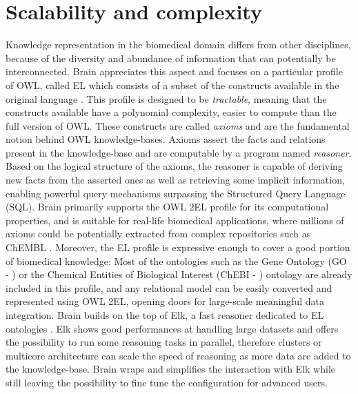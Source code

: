 \documentclass{bioinfo}
\begin{document}
\section{Scalability and complexity}
Knowledge representation in the biomedical domain differs from other disciplines, because of the diversity and abundance of
information that can potentially be interconnected. Brain appreciates this aspect and focuses on a particular profile of OWL, called EL
which consists of a subset of the constructs available in the original language \citep{Motik2009}. This profile is
designed to be \emph{tractable}, meaning that the constructs available have a polynomial complexity, easier to compute than the full 
version of OWL. 
These constructs are called \emph{axioms} and are the fundamental notion behind OWL knowledge-bases.
Axioms assert the facts and relations present in the knowledge-base and are computable by a program named \emph{reasoner}. 
Based on the logical structure of the axioms, the reasoner is capable of deriving new facts from the asserted ones as well as retrieving
some implicit information, enabling powerful query mechanisms surpassing the Structured Query Language (SQL). 
Brain primarily supports the OWL 2EL profile for its computational properties, and is suitable for real-life biomedical applications, 
where millions of axioms could be potentially extracted from complex repositories such as ChEMBL \citep{Gaulton2012}.
Moreover, the EL profile is expressive enough to cover a good portion of biomedical knowledge: Most of the ontologies such as 
the Gene Ontology (GO - \citealp{Ashburner2000}) or 
the Chemical Entities of Biological Interest (ChEBI - \citealp{DeMatos2010}) ontology are already included in this 
profile, and any relational model can be easily 
converted and represented using OWL 2EL, opening doors for large-scale meaningful data integration.
Brain builds on the top of Elk, a fast reasoner dedicated to EL ontologies \citep{YevgenyKazakov2011}. Elk shows good 
performances at handling 
large datasets and offers the possibility to run some reasoning tasks in parallel, therefore
clusters or multicore architecture can scale the speed of reasoning as more data are added to the knowledge-base.
Brain wraps and simplifies the interaction with Elk while still leaving the possibility to fine tune 
the configuration for advanced users.
\end{document}
